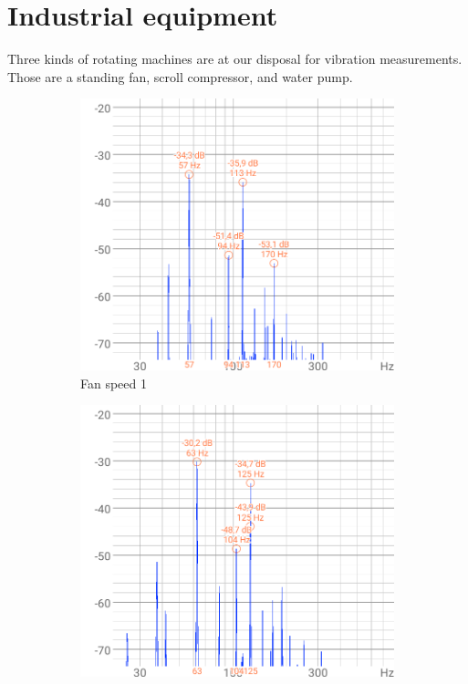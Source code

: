 \section{Industrial equipment}
Three kinds of rotating machines are at our disposal for vibration measurements. Those are a standing fan, scroll compressor, and water pump.

\begin{figure}[h]
    \centering
    \begin{subfigure}[b]{0.3\textwidth}
        \includegraphics[width=\textwidth]{assets/results/standing-fan/fan-audio-speed-1.png}
        \caption{Fan speed 1}
    \end{subfigure}
    \hfill
    \begin{subfigure}[b]{0.3\textwidth}
        \includegraphics[width=\textwidth]{assets/results/standing-fan/fan-audio-speed-2.png}

\end{subfigure}
\end{figure}
